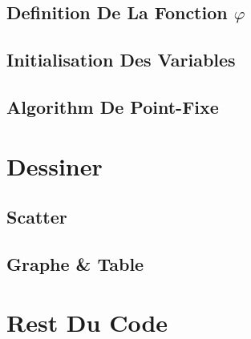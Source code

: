 \subsection{Definition De La Fonction \(\varphi\)}


\vspace{0.5cm}
\subsection{Initialisation Des Variables}


\vspace{0.5cm}
\subsection{Algorithm De Point-Fixe}


\newpage
\section{Dessiner}
\subsection{Scatter}

\vspace{0.5cm}

\subsection{Graphe \& Table }


\vspace{1cm}

\section{Rest Du Code}


\vspace{1.5cm}
